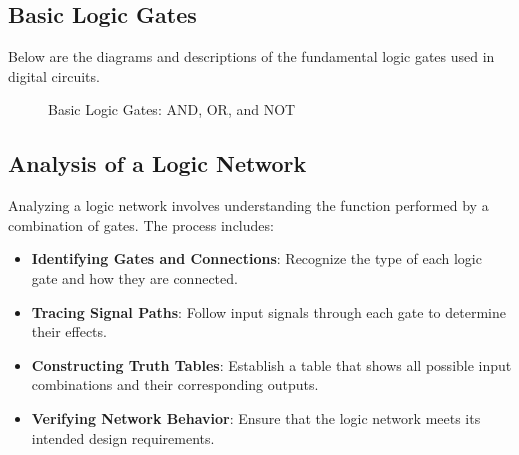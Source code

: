 \documentclass[twocolumn]{article}
\begin{document}
\subsection{Basic Logic Gates}
Below are the diagrams and descriptions of the fundamental logic gates used in digital circuits.

\begin{figure}[ht]
  \centering
  \caption{Basic Logic Gates: AND, OR, and NOT}
\end{figure}

\pagebreak

\subsection{Analysis of a Logic Network}
Analyzing a logic network involves understanding the function performed by a combination of gates. The process includes:
\begin{itemize}
    \item \textbf{Identifying Gates and Connections}: Recognize the type of each logic gate and how they are connected.
    \item \textbf{Tracing Signal Paths}: Follow input signals through each gate to determine their effects.
    \item \textbf{Constructing Truth Tables}: Establish a table that shows all possible input combinations and their corresponding outputs.
    \item \textbf{Verifying Network Behavior}: Ensure that the logic network meets its intended design requirements.
\end{itemize}
\end{document}
